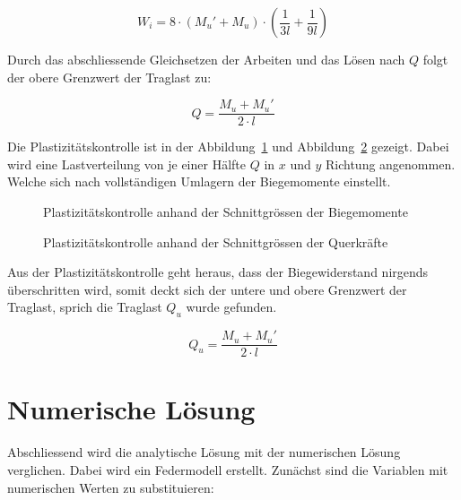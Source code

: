 \documentclass[
  11pt,
  letterpaper,
]{scrreprt}
\begin{document}
\[
W_i = 8 \cdot \left(M_u' + M_u\right) \cdot \left(\frac{1}{3l} +\frac{1}{9l}\right)
\]

Durch das abschliessende Gleichsetzen der Arbeiten und das Lösen nach
\(Q\) folgt der obere Grenzwert der Traglast zu:

\[
Q = \frac{M_u + M_u'}{2 \cdot l}
\]

Die Plastizitätskontrolle ist in der Abbildung~\ref{fig-trm_schnitt_my}
und Abbildung~\ref{fig-trm_schnitt_vz} gezeigt. Dabei wird eine
Lastverteilung von je einer Hälfte \(Q\) in \(x\) und \(y\) Richtung
angenommen. Welche sich nach vollständigen Umlagern der Biegemomente
einstellt.

\begin{figure}[H]


\caption{\label{fig-trm_schnitt_my}Plastizitätskontrolle anhand der
Schnittgrössen der Biegemomente}

\end{figure}%

\begin{figure}[H]


\caption{\label{fig-trm_schnitt_vz}Plastizitätskontrolle anhand der
Schnittgrössen der Querkräfte}

\end{figure}%

Aus der Plastizitätskontrolle geht heraus, dass der Biegewiderstand
nirgends überschritten wird, somit deckt sich der untere und obere
Grenzwert der Traglast, sprich die Traglast \(Q_u\) wurde gefunden.

\[
Q_u = \frac{M_u + M_u'}{2 \cdot l}
\]

\section{Numerische Lösung}\label{numerische-luxf6sung}

Abschliessend wird die analytische Lösung mit der numerischen Lösung
verglichen. Dabei wird ein Federmodell erstellt. Zunächst sind die
Variablen mit numerischen Werten zu substituieren:
\end{document}
